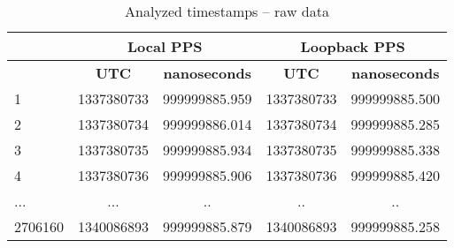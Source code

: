 \begin{table}[!t]
\caption{Analyzed timestamps -- raw data}
\centering
\begin{tabular}{| l | c| c | c | c |}          \hline
& \multicolumn{2}{|c|}{\textbf{Local PPS }}  &  
\multicolumn{2}{|c|}{\textbf{Loopback PPS}}   \\   \hline
& \textbf{UTC} & \textbf{nanoseconds} & \textbf{UTC} & \textbf{nanoseconds} \\   \hline

1       & 1337380733 & 999999885.959 & 1337380733 & 999999885.500 \\   \hline
2       & 1337380734 & 999999886.014 & 1337380734 & 999999885.285 \\   \hline
3       & 1337380735 & 999999885.934 & 1337380735 & 999999885.338 \\   \hline
4       & 1337380736 & 999999885.906 & 1337380736 & 999999885.420 \\   \hline
...     &      ...   &  ..           &     ..     &      ..       \\   \hline
2706160 & 1340086893 & 999999885.879 & 1340086893 & 999999885.258 \\   \hline
         
\end{tabular}
\label{tab:rawData}
\end{table}

%


